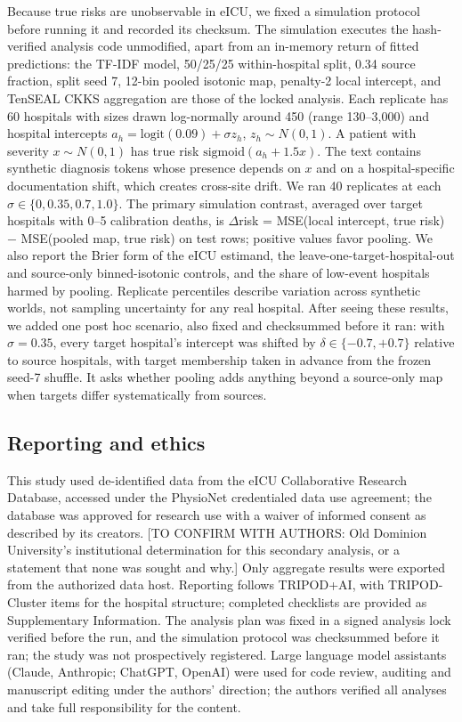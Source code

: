 \documentclass[11pt]{article}
\begin{document}
Because true risks are unobservable in eICU, we fixed a simulation protocol before running it and recorded its checksum. The simulation executes the hash-verified analysis code unmodified, apart from an in-memory return of fitted predictions: the TF-IDF model, 50/25/25 within-hospital split, 0.34 source fraction, split seed 7, 12-bin pooled isotonic map, penalty-2 local intercept, and TenSEAL CKKS aggregation are those of the locked analysis. Each replicate has 60 hospitals with sizes drawn log-normally around 450 (range 130--3,000) and hospital intercepts $a_h=\mathrm{logit}(0.09)+\sigma z_h$, $z_h\sim N(0,1)$. A patient with severity $x\sim N(0,1)$ has true risk $\mathrm{sigmoid}(a_h+1.5x)$. The text contains synthetic diagnosis tokens whose presence depends on $x$ and on a hospital-specific documentation shift, which creates cross-site drift. We ran 40 replicates at each $\sigma\in\{0,0.35,0.7,1.0\}$. The primary simulation contrast, averaged over target hospitals with 0--5 calibration deaths, is $\Delta$risk = MSE(local intercept, true risk) $-$ MSE(pooled map, true risk) on test rows; positive values favor pooling. We also report the Brier form of the eICU estimand, the leave-one-target-hospital-out and source-only binned-isotonic controls, and the share of low-event hospitals harmed by pooling. Replicate percentiles describe variation across synthetic worlds, not sampling uncertainty for any real hospital. After seeing these results, we added one post hoc scenario, also fixed and checksummed before it ran: with $\sigma=0.35$, every target hospital's intercept was shifted by $\delta\in\{-0.7,+0.7\}$ relative to source hospitals, with target membership taken in advance from the frozen seed-7 shuffle. It asks whether pooling adds anything beyond a source-only map when targets differ systematically from sources.



\subsection*{Reporting and ethics}
This study used de-identified data from the eICU Collaborative Research Database, accessed under the PhysioNet credentialed data use agreement\cite{r1}; the database was approved for research use with a waiver of informed consent as described by its creators\cite{r2}. [TO CONFIRM WITH AUTHORS: Old Dominion University's institutional determination for this secondary analysis, or a statement that none was sought and why.] Only aggregate results were exported from the authorized data host. Reporting follows TRIPOD+AI, with TRIPOD-Cluster items for the hospital structure\cite{r9,r19}; completed checklists are provided as Supplementary Information. The analysis plan was fixed in a signed analysis lock verified before the run, and the simulation protocol was checksummed before it ran; the study was not prospectively registered. Large language model assistants (Claude, Anthropic; ChatGPT, OpenAI) were used for code review, auditing and manuscript editing under the authors' direction; the authors verified all analyses and take full responsibility for the content.
\end{document}
